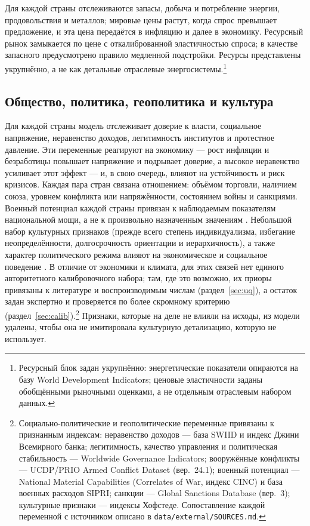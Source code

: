 \documentclass[11pt,a4paper]{article}
\begin{document}
Для каждой страны отслеживаются запасы, добыча и потребление энергии, продовольствия и
металлов; мировые цены растут, когда спрос превышает предложение, и эта цена передаётся
в инфляцию и далее в экономику. Ресурсный рынок замыкается по цене с откалиброванной
эластичностью спроса; в качестве запасного предусмотрено правило медленной подстройки.
Ресурсы представлены укрупнённо, а не как детальные отраслевые энергосистемы.\footnote{Ресурсный
блок задан укрупнённо: энергетические показатели опираются на базу World Development Indicators;
ценовые эластичности заданы обобщёнными рыночными оценками, а не отдельным отраслевым набором
данных.}

\subsection{Общество, политика, геополитика и культура}

Для каждой страны модель отслеживает доверие к власти, социальное напряжение, неравенство
доходов, легитимность институтов и протестное давление. Эти переменные реагируют на
экономику --- рост инфляции и безработицы повышает напряжение и подрывает доверие, а
высокое неравенство усиливает этот эффект --- и, в свою очередь, влияют на устойчивость и
риск кризисов. Каждая пара стран связана отношением: объёмом торговли, наличием союза,
уровнем конфликта или напряжённости, состоянием войны и санкциями. Военный потенциал
каждой страны привязан к наблюдаемым показателям национальной мощи, а не к произвольно
назначенным значениям \citep{singer1972}. Небольшой набор культурных признаков (прежде всего степень
индивидуализма, избегание неопределённости, долгосрочность ориентации и иерархичность),
а также характер политического режима влияют на экономическое и социальное поведение
\citep{hofstede2010}. В отличие от экономики и климата, для этих связей нет единого
авторитетного калибровочного набора; там, где это возможно, их приоры привязаны к литературе и
воспроизводимым числам (раздел~\ref{sec:uq}), а остаток задан экспертно и проверяется по более
скромному критерию (раздел~\ref{sec:calib}).\footnote{Социально-политические
и геополитические переменные привязаны к признанным индексам: неравенство доходов --- база SWIID
и индекс Джини Всемирного банка; легитимность, качество управления и политическая стабильность ---
Worldwide Governance Indicators; вооружённые конфликты --- UCDP/PRIO Armed Conflict Dataset
(вер.~24.1); военный потенциал --- National Material Capabilities (Correlates of War, индекс CINC) и
база военных расходов SIPRI; санкции --- Global Sanctions Database (вер.~3); культурные признаки ---
индексы Хофстеде. Сопоставление каждой переменной с источником описано в \texttt{data/external/SOURCES.md}.}
Признаки, которые на деле не влияли на исходы, из модели удалены, чтобы она не
имитировала культурную детализацию, которую не использует.
\end{document}
